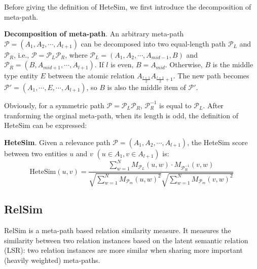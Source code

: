 \documentclass{acm_proc_article-csis8101}
\begin{document}
Before giving the definition of HeteSim, we first introduce the decomposition of meta-path.

\begin{definition}
{\bf Decomposition of meta-path}. An arbitrary meta-path $\mathcal{P}=(A_{1}, A_{2}, \cdots, A_{l+1})$ can be decomposed into two equal-length path $\mathcal{P}_{L}$ and $\mathcal{P}_{R}$, i.e., $\mathcal{P} = \mathcal{P}_{L}\mathcal{P}_{R}$, where $\mathcal{P}_{L}=(A_{1}, A_{2}, \cdots, A_{mid-1}, B)$ and $\mathcal{P}_{R}=(B, A_{mid+1}, \cdots, A_{l+1})$. If $l$ is even, $B=A_{mid}$. Otherwise, $B$ is the middle type entity $E$ between the atomic relation $A_{\frac{l+1}{2}}A_{\frac{l+1}{2}+1}$. The new path becomes $\mathcal{P}'=(A_{1}, \cdots, E, \cdots, A_{l+1})$, so $B$ is also the middle item of $\mathcal{P}'$.
\end{definition}

Obviously, for a symmetric path $\mathcal{P} = \mathcal{P}_{L}\mathcal{P}_{R}$, $\mathcal{P}_{R}^{-1}$ is equal to $\mathcal{P}_{L}$. After tranforming the orginal meta-path, when its length is odd, the definition of HeteSim can be expressed:

\begin{definition}
{\bf HeteSim}. Given a relevance path $\mathcal{P}=(A_{1}, A_{2}, \cdots, A_{l+1})$, the HeteSim score between two entities $u$ and $v$ $(u \in A_{1}, v \in A_{l+1})$ is:
\begin{equation}
\text{HeteSim}(u, v) = \frac{\sum^{N}_{w=1}M_{\mathcal{P}_{L}}(u, w) \cdot M_{\mathcal{P}_{R}^{-1}}(v, w)}{\sqrt{\sum^{N}_{w=1}M_{\mathcal{P}_{m}}(u,w)^2}\sqrt{\sum^{N}_{w=1}M_{\mathcal{P}_{m}}(v,w)^2}}
\end{equation}
\end{definition}

\subsection{RelSim}

RelSim \cite{wang2016relsim} is a meta-path based relation similarity measure. It measures the similarity between two relation instances based on the latent semantic relation (LSR): two relation instances are more similar when sharing more important (heavily weighted) meta-paths.
\end{document}
